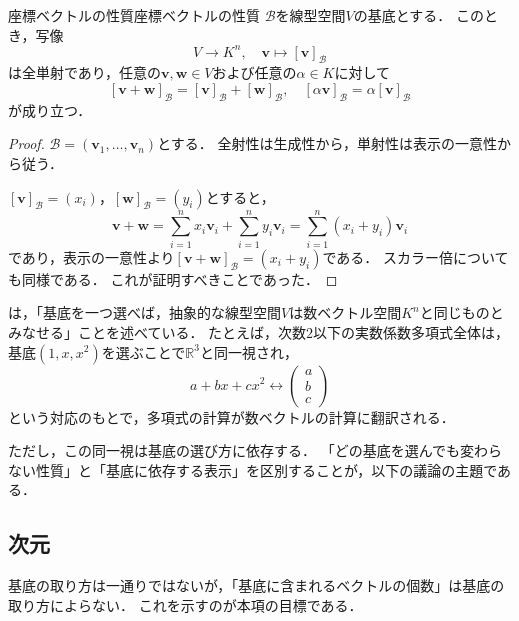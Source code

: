 \begin{prop}{座標ベクトルの性質}{座標ベクトルの性質}
  $\mathcal{B}$を線型空間$V$の基底とする．
  このとき，写像
  \[
    V \to K^n, \quad \bm{v} \mapsto [\bm{v}]_{\mathcal{B}}
  \]
  は全単射であり，任意の$\bm{v}, \bm{w} \in V$および任意の$\alpha \in K$に対して
  \[
    [\bm{v} + \bm{w}]_{\mathcal{B}} = [\bm{v}]_{\mathcal{B}} + [\bm{w}]_{\mathcal{B}},
    \quad
    [\alpha \bm{v}]_{\mathcal{B}} = \alpha [\bm{v}]_{\mathcal{B}}
  \]
  が成り立つ．
\end{prop}

\begin{leftbar}
\begin{proof}
  $\mathcal{B} = (\bm{v}_1, \dots, \bm{v}_n)$とする．
  全射性は生成性から，単射性は表示の一意性から従う．

  $[\bm{v}]_{\mathcal{B}} = (x_i)$，$[\bm{w}]_{\mathcal{B}} = (y_i)$とすると，
  \[
    \bm{v} + \bm{w}
    = \sum_{i=1}^{n} x_i \bm{v}_i + \sum_{i=1}^{n} y_i \bm{v}_i
    = \sum_{i=1}^{n} (x_i + y_i) \bm{v}_i
  \]
  であり，表示の一意性より$[\bm{v} + \bm{w}]_{\mathcal{B}} = (x_i + y_i)$である．
  スカラー倍についても同様である．
  これが証明すべきことであった．
\end{proof}
\end{leftbar}

\begin{remark}
  は，「基底を一つ選べば，抽象的な線型空間$V$は数ベクトル空間$K^n$と同じものとみなせる」ことを述べている．
  たとえば，次数$2$以下の実数係数多項式全体は，基底$(1, x, x^2)$を選ぶことで$\mathbb{R}^3$と同一視され，
  \[
    a + bx + cx^2 \longleftrightarrow \begin{pmatrix} a \\ b \\ c \end{pmatrix}
  \]
  という対応のもとで，多項式の計算が数ベクトルの計算に翻訳される．

  ただし，この同一視は基底の選び方に依存する．
  「どの基底を選んでも変わらない性質」と「基底に依存する表示」を区別することが，以下の議論の主題である．
\end{remark}

\subsection{次元}

基底の取り方は一通りではないが，「基底に含まれるベクトルの個数」は基底の取り方によらない．
これを示すのが本項の目標である．

